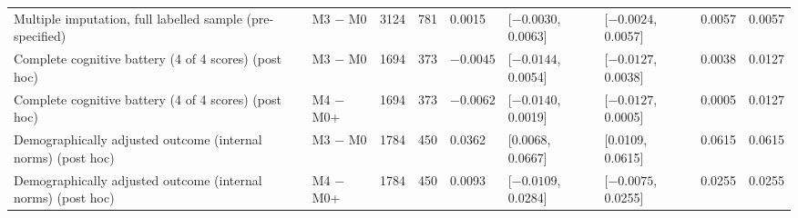 \documentclass[11pt]{article}
\begin{document}
\begin{landscape}
{\begin{longtable}{L{5.8cm}L{1.9cm}R{1.0cm}R{1.1cm}R{1.5cm}R{3.1cm}R{3.1cm}R{1.6cm}R{1.6cm}}
Multiple imputation, full labelled sample (pre-specified) & M3 $-$ M0 & 3124 & 781 & 0.0015 & [$-0.0030$, 0.0063] & [$-0.0024$, 0.0057] & 0.0057 & 0.0057 \\
Complete cognitive battery (4 of 4 scores) (post hoc) & M3 $-$ M0 & 1694 & 373 & $-0.0045$ & [$-0.0144$, 0.0054] & [$-0.0127$, 0.0038] & 0.0038 & 0.0127 \\
Complete cognitive battery (4 of 4 scores) (post hoc) & M4 $-$ M0+ & 1694 & 373 & $-0.0062$ & [$-0.0140$, 0.0019] & [$-0.0127$, 0.0005] & 0.0005 & 0.0127 \\
Demographically adjusted outcome (internal norms) (post hoc) & M3 $-$ M0 & 1784 & 450 & 0.0362 & [0.0068, 0.0667] & [0.0109, 0.0615] & 0.0615 & 0.0615 \\
Demographically adjusted outcome (internal norms) (post hoc) & M4 $-$ M0+ & 1784 & 450 & 0.0093 & [$-0.0109$, 0.0284] & [$-0.0075$, 0.0255] & 0.0255 & 0.0255 \\
\end{longtable}
}
\end{landscape}
\end{document}

